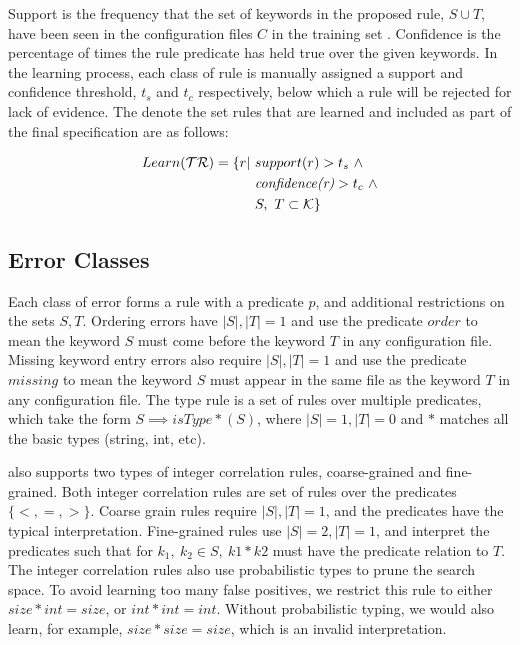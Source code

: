Support is the frequency that the set of keywords in the proposed rule, $S \cup T$, have been seen in the configuration files $C$ in the training set \trainingSet.
Confidence is the percentage of times the rule predicate has held true over the given keywords.
In the learning process, each class of rule is manually assigned a support and confidence threshold, $t_s$ and $t_c$ respectively, below which a rule will be rejected for lack of evidence.
The denote the set rules that are learned and included as part of the final specification are as follows:

\begin{align}
Learn(\mathcal{TR}) = \{r | \ &support(r) > t_s\ \land \nonumber \\
    & \textit{confidence(r)} > t_c\ \land \label{eq:learn}\\ 
    & S,\ T \subset \mathcal{K}\} \nonumber
\end{align}

\subsection{Error Classes}
Each class of error forms a rule with a predicate $p$, and additional restrictions on the sets $S, T$.
Ordering errors have $|S|, |T| = 1$ and use the predicate $order$ to mean the keyword $S$ must come before the keyword $T$ in any configuration file.
Missing keyword entry errors also require $|S|, |T| = 1$ and use the predicate $missing$ to mean the keyword $S$ must appear in the same file as the keyword $T$ in any configuration file.
The type rule is a set of rules over multiple predicates, which take the
form $S \implies \textit{isType}\ast(S)$, where $|S|=1, |T|=0$ and $\ast$ matches all the basic types (string, int, etc).

\app also supports two types of integer correlation rules, coarse-grained and fine-grained.
Both integer correlation rules are set of rules over the predicates $\{<,=,>\}$.
Coarse grain rules require $|S|, |T| = 1$, and the predicates have the typical interpretation.
Fine-grained rules use $|S|=2,|T|=1$, and interpret the predicates such that for $k_1,\ k_2 \in S,\ k1*k2$ must have the predicate relation to $T$.
The integer correlation rules also use probabilistic types to prune the search space.
To avoid learning too many false positives, we restrict this rule to either $size*int=size$, or $int*int = int$.
Without probabilistic typing, we would also learn, for example, $size*size=size$, which is an invalid interpretation.

